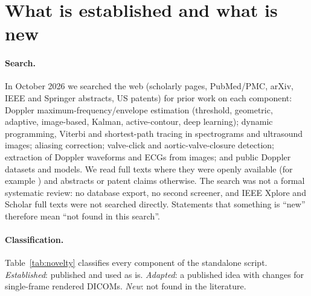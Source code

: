 \documentclass[10pt,a4paper]{article}
\begin{document}
\section{What is established and what is new}
\label{sec:novelty}
\paragraph{Search.} In October 2026 we searched the web (scholarly pages, PubMed/PMC, arXiv, IEEE and Springer abstracts, US patents) for
prior work on each component: Doppler maximum-frequency/envelope estimation (threshold, geometric, adaptive, image-based, Kalman, active-contour,
deep learning); dynamic programming, Viterbi and shortest-path tracing in spectrograms and ultrasound images; aliasing correction; valve-click
and aortic-valve-closure detection; extraction of Doppler waveforms and ECGs from images; and public Doppler datasets and models. We read full texts
where they were openly available (for example \cite{zolgharni}) and abstracts or patent claims otherwise. The search was not a formal
systematic review: no database export, no second screener, and IEEE Xplore and Scholar full texts were not searched directly. Statements that
something is ``new'' therefore mean ``not found in this search''.

\paragraph{Classification.} Table~\ref{tab:novelty} classifies every component of the standalone script.
\emph{Established}: published and used as is. \emph{Adapted}: a published idea with changes for single-frame rendered DICOMs.
\emph{New}: not found in the literature.
\end{document}
